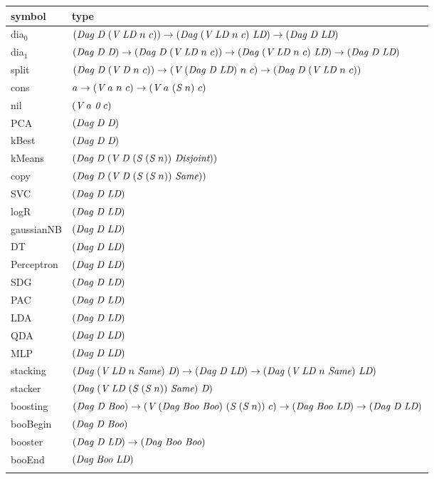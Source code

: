 \documentclass{ws-ijait}
\begin{document}
\begin{table}[ht]
{\begin{tabular}{ll}
\toprule
symbol 				& type      \\
\toprule
dia$_0$ & $\splitter{\D}{\LD}{n}{c} \ar \merger{\LD}{\LD}{n}{c} \ar \DAG{\D}{\LD}$ \\
dia$_1$ & $\DAG{\D}{\D} \ar \splitter{\D}{\LD}{n}{c} \ar \merger{\LD}{\LD}{n}{c} \ar \DAG{\D}{\LD}$ \\
split   & $\splitter{\D}{\D}{n}{c} \ar \Ve{\DAG{\D}{\LD}}{n}{c} \ar \splitter{\D}{\LD}{n}{c}$ \\
cons    & $a \ar \Ve{a}{n}{c} \ar \Ve{a}{\Suc{n}}{c}$ \\
nil     & $\Ve{a}{\Zero}{c}$ \\
\colrule
PCA     & $\DAG{\D}{\D}$ \\
kBest   & $\DAG{\D}{\D}$ \\
\colrule
kMeans  & $\splitter{\D}{\D}{\dvaPlus{n}}{\Disjoint}$ \\
copy    & $\splitter{\D}{\D}{\dvaPlus{n}}{\Same}$ \\
\colrule
SVC        & $\DAG{\D}{\LD}$ \\
logR       & $\DAG{\D}{\LD}$ \\
gaussianNB & $\DAG{\D}{\LD}$ \\
DT         & $\DAG{\D}{\LD}$ \\
Perceptron & $\DAG{\D}{\LD}$ \\
SDG        & $\DAG{\D}{\LD}$ \\
PAC        & $\DAG{\D}{\LD}$ \\
LDA        & $\DAG{\D}{\LD}$ \\
QDA        & $\DAG{\D}{\LD}$ \\
MLP        & $\DAG{\D}{\LD}$ \\
\colrule
stacking   & $\merger{\LD}{\D}{n}{\Same} \ar \DAG{\D}{\LD} \ar \merger{\LD}{\LD}{n}{\Same}$ \\
stacker    & $\merger{\LD}{\D}{\dvaPlus{n}}{\Same}$ \\
\colrule
boosting & $\DAG{\D}{\Boo} \ar \Ve{\DAG{\Boo}{\Boo}}{\dvaPlus{n}}{c} \ar \DAG{\Boo}{\LD} \ar \DAG{\D}{\LD}$ \\
booBegin   & $\DAG{\D}{\Boo}$ \\
booster    & $\DAG{\D}{\LD} \ar \DAG{\Boo}{\Boo}$ \\
booEnd     & $\DAG{\Boo}{\LD}$ \\
\botrule
\end{tabular}}
\end{table} 
\end{document}
